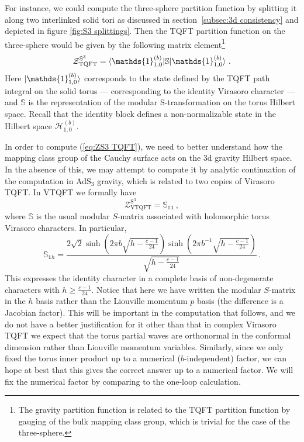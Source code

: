 \documentclass[12pt,a4paper]{article}
\newcommand{\id}{\mathds{1}}
\renewcommand{\geq}{\geqslant}
\begin{document}
For instance, we could compute the three-sphere partition function by splitting it along two interlinked solid tori as discussed in section~\ref{subsec:3d consistency} and depicted in figure \ref{fig:S3 splittings}. Then the TQFT partition function on the three-sphere would be given by the following matrix element\footnote{The gravity partition function is related to the TQFT partition function by gauging of the bulk mapping class group, which is trivial for the case of the three-sphere.} 
\begin{equation}\label{eq:ZS3 TQFT}
    \mathcal{Z}^{\text{S}^3}_{\text{TQFT}} = \braket{\id_{1,0}^{(b)}|\mathbb{S}|\id_{1,0}^{(b)}}\, .
\end{equation}
Here $\ket{\id_{1,0}^{(b)}}$
corresponds to the state defined by the TQFT path integral on the solid torus --- corresponding to the identity Virasoro character --- and $\mathbb{S}$ is the representation of the modular S-transformation on the torus Hilbert space. Recall that the identity block defines a non-normalizable state in the Hilbert space $\mathcal{H}_{1,0}^{(b)}$.

In order to compute (\ref{eq:ZS3 TQFT}), we need to better understand how the mapping class group of the Cauchy surface acts on the 3d gravity Hilbert space. In the absence of this, we may attempt to compute it by analytic continuation of the computation in AdS$_3$ gravity, which is related to two copies of Virasoro TQFT. In VTQFT we formally have 
\begin{equation}
    \mathcal{Z}_{\text{VTQFT}}^{\text{S}^3} = \mathbb{S}_{\id\id}\, ,
\end{equation}
where $\mathbb{S}$ is the usual modular $S$-matrix associated with holomorphic torus Virasoro characters. In particular,
\begin{equation}
    \mathbb{S}_{\id h} = \frac{2\sqrt{2}\sinh\left(2\pi b \sqrt{h-\frac{c-1}{24}}\right)\sinh\left(2\pi b^{-1}\sqrt{h-\frac{c-1}{24}}\right)}{\sqrt{h-\frac{c-1}{24}}}\, .
\end{equation}
This expresses the identity character in a complete basis of non-degenerate characters with $h \geq \tfrac{c-1}{24}$. Notice that here we have written the modular $S$-matrix in the $h$ basis rather than the Liouville momentum $p$ basis (the difference is a Jacobian factor). This will be important in the computation that follows, and we do not have a better justification for it other than that in complex Virasoro TQFT we expect that the torus partial waves are orthonormal in the conformal dimension rather than Liouville momentum variables. Similarly, since we only fixed the torus inner product up to a numerical ($b$-independent) factor, we can hope at best that this gives the correct answer up to a numerical factor. We will fix the numerical factor by comparing to the one-loop calculation.
\end{document}

